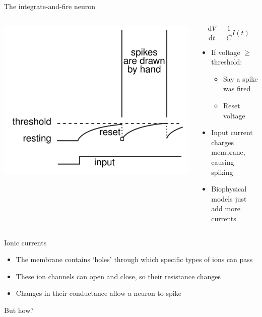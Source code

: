 \documentclass[presentation]{beamer}
\begin{document}
\begin{frame}[label={sec:orgf070ceb}]{The integrate-and-fire neuron}
\begin{columns}
\begin{column}{0.5\columnwidth}
\begin{center}
\includegraphics[width=.9\linewidth]{./ifneuron.png}
\end{center}
\end{column}

\begin{column}{0.5\columnwidth}
\begin{equation}
\frac{\mathrm{d}V}{\mathrm{d}t} = \frac{1}{C} I(t)
\end{equation}

\begin{itemize}
\item If voltage \(\geq\) threshold:
\begin{itemize}
\item Say a spike was fired
\item Reset voltage
\end{itemize}
\item Input current charges membrane, causing spiking
\item Biophysical models just add more currents
\end{itemize}
\end{column}
\end{columns}
\end{frame}

\begin{frame}[label={sec:orgf519ffe}]{Ionic currents}
\begin{itemize}
\item The membrane contains `holes' through which specific types of ions can pass
\item These ion channels can open and close, so their resistance changes
\item Changes in their conductance allow a neuron to spike
\end{itemize}
\vfill

But how?
\end{frame}
\end{document}
